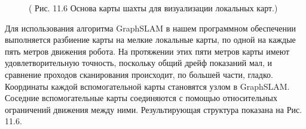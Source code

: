 \documentclass[10pt,a4paper]{article}
\begin{document}
\begin{figure}[H]
	\caption{ ( Рис. 11.6 Основа карты шахты для визуализации локальных карт.) }
	\label{fig:116orig}
\end{figure}

Для использования алгоритма GraphSLAM в нашем программном обеспечении выполняется разбиение карты на мелкие локальные карты, по одной на каждые пять метров движения робота. На протяжении этих пяти метров карты имеют удовлетворительную точность, поскольку общий дрейф показаний мал, и сравнение проходов сканирования происходит, по большей части, гладко. Координаты каждой вспомогательной карты становятся узлом в GraphSLAM. Соседние вспомогательные карты соединяются с помощью относительных ограничений движения между ними. Результирующая структура показана на Рис. 11.6.
\end{document}
